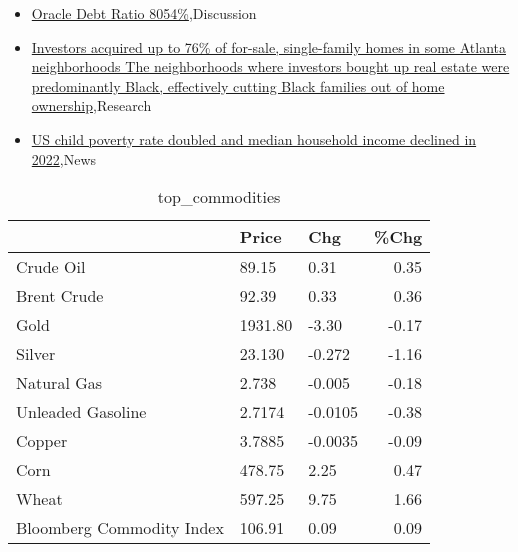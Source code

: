 \documentclass{article}%
\begin{document}
\begin{itemize}
\item%
\href{https://reddit.com/r/StockMarket/comments/16h0eme/oracle\_debt\_ratio\_8054/}{Oracle Debt Ratio 8054\%},Discussion%
\item%
\href{https://reddit.com/r/Economics/comments/16he6vk/investors\_acquired\_up\_to\_76\_of\_forsale/}{Investors acquired up to 76\% of for-sale, single-family homes in some Atlanta neighborhoods  The neighborhoods where investors bought up real estate were predominantly Black, effectively cutting Black families out of home ownership},Research%
\item%
\href{https://reddit.com/r/Economics/comments/16hbkd3/us\_child\_poverty\_rate\_doubled\_and\_median/}{US child poverty rate doubled and median household income declined in 2022},News%
\end{itemize}%


\begin{table}[htbp]%
\caption{top\_commodities}%
\centering%
\begin{adjustbox}{width=1\textwidth}%
\begin{tabular}{lllr}
\toprule
                          &   Price &     Chg &  \%Chg \\
\midrule
               Crude Oil  &   89.15 &    0.31 &  0.35 \\
             Brent Crude  &   92.39 &    0.33 &  0.36 \\
                    Gold  & 1931.80 &   -3.30 & -0.17 \\
                  Silver  &  23.130 &  -0.272 & -1.16 \\
             Natural Gas  &   2.738 &  -0.005 & -0.18 \\
       Unleaded Gasoline  &  2.7174 & -0.0105 & -0.38 \\
                  Copper  &  3.7885 & -0.0035 & -0.09 \\
                    Corn  &  478.75 &    2.25 &  0.47 \\
                   Wheat  &  597.25 &    9.75 &  1.66 \\
Bloomberg Commodity Index &  106.91 &    0.09 &  0.09 \\
\bottomrule
\end{tabular}
%
\end{adjustbox}%
\end{table}

%
\end{document}

